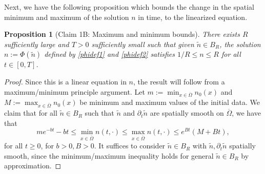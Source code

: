 \documentclass[12pt]{article}
\theoremstyle{plain}
\newtheorem{proposition}{Proposition}[section]
\begin{document}
\medskip

Next, we have the following proposition which bounds the change in the spatial minimum and maximum of the solution $n$ in time, to the linearized equation.

\begin{proposition}[Claim 1B: Maximum and minimum bounds]\label{1B}
There exists $R$ sufficiently large and $T > 0$ sufficiently small such that given $\tilde{n} \in B_{R}$, the solution $n := \Phi(\tilde{n})$ defined by \eqref{phidef1} and \eqref{phidef2} satisfies $1/R \le n \le R$ for all $t \in [0, T]$.
\end{proposition}
\begin{proof}
Since this is a linear equation in $n$, the result will follow from a maximum/minimum principle argument. Let $m := \min_{x \in \overline{\Omega}} n_{0}(x)$ and $M := \max_{x \in \overline{\Omega}} n_{0}(x)$ be minimum and maximum values of the initial data. We claim that for all $\tilde{n} \in B_{R}$ such that $\tilde{n}$ and $\partial_{t}\tilde{n}$ are spatially smooth on $\overline{\Omega}$, we have that
\begin{equation*}
me^{-bt} - bt \le \min_{x \in \overline{\Omega}} n(t, \cdot) \le \max_{x \in \overline{\Omega}} n(t, \cdot) \le e^{Bt}(M + Bt),
\end{equation*}
for all $t \ge 0$, for $b > 0, B > 0$. It suffices to consider $\tilde{n} \in B_{R}$ with $\tilde{n}, \partial_{t}\tilde{n}$ spatially smooth, since the minimum/maximum inequality holds for general $\tilde{n} \in B_{R}$ by approximation. 

\medskip


\end{proof}
\end{document}
